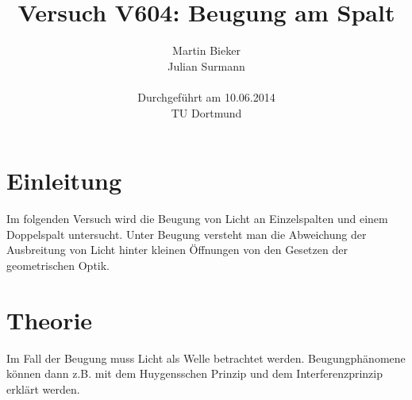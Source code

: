 \documentclass[11pt,ngerman,a4paper]{article}
\title{\textbf{Versuch V604: Beugung am Spalt}}
\author{Martin Bieker\\
Julian Surmann\\
\\
Durchgef\"{u}hrt am 10.06.2014\\
TU Dortmund}
\date{}
\begin{document}
\renewcommand\tablename{Tabelle}
\renewcommand\figurename{Abbildung}
\maketitle
\thispagestyle{empty}
\newpage
\clearpage
\setcounter{page}{1}


\section{Einleitung}
Im folgenden Versuch wird die Beugung von Licht an Einzelspalten und einem Doppelspalt untersucht. Unter Beugung versteht man die Abweichung der Ausbreitung von Licht hinter kleinen Öffnungen von den Gesetzen der geometrischen Optik.
\section{Theorie}
Im Fall der Beugung muss Licht als Welle betrachtet werden. Beugungphänomene können dann z.B. mit dem Huygensschen Prinzip und dem Interferenzprinzip erklärt werden.
\end{document}
